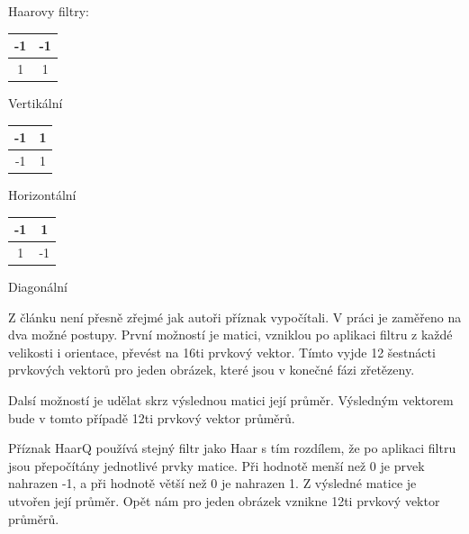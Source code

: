 \documentclass[czech,BP]{thesiskiv}
\begin{document}
\vspace{0.5cm}
\noindent Haarovy filtry: 

\begin{multicols}{3}
	\begin{center}
		\begin{tabular}{ | c | c | }
    		\hline
    		\cellcolor{ashgrey!50}-1 & \cellcolor{ashgrey!50}-1 \\ \hline
    		1 & 1 \\ 
    		\hline
    	\end{tabular}
    	\vspace{0.5cm}
    	\par Vertikální
	\end{center}
	\begin{center}
		\begin{tabular}{ | c | c | }
    		\hline
    		\cellcolor{ashgrey!50}-1 & 1 \\ \hline
    		\cellcolor{ashgrey!50}-1 & 1 \\ 
    		\hline
    	\end{tabular}
		\vspace{0.5cm}
    	\par Horizontální
	\end{center} 	
	\begin{center}
		\begin{tabular}{ | c | c | }
    		\hline
    		\cellcolor{ashgrey!50}-1 & 1 \\ \hline
    		1 & \cellcolor{ashgrey!50}-1 \\ 
    		\hline
    	\end{tabular}
		\vspace{0.5cm}
    	\par Diagonální
	\end{center} 	
\end{multicols}

\par Z článku \cite{JEC} není přesně zřejmé jak autoři příznak vypočítali. V práci je zaměřeno na dva možné postupy. První možností je matici, vzniklou po aplikaci filtru z každé velikosti i orientace, převést na 16ti prvkový vektor. Tímto vyjde 12 šestnácti prvkových vektorů pro jeden obrázek, které jsou v konečné fázi zřetězeny. 
\par Dalsí možností je udělat skrz výslednou matici její průměr. Výsledným vektorem bude v tomto případě 12ti prvkový vektor průměrů. 

\par Příznak HaarQ používá stejný filtr jako Haar s tím rozdílem, že po aplikaci filtru jsou přepočítány jednotlivé prvky matice. Při hodnotě menší než 0 je prvek nahrazen -1, a při hodnotě větší než 0 je nahrazen 1. Z výsledné matice je utvořen její průměr. Opět nám pro jeden obrázek vznikne 12ti prvkový vektor průměrů.   
\end{document}
